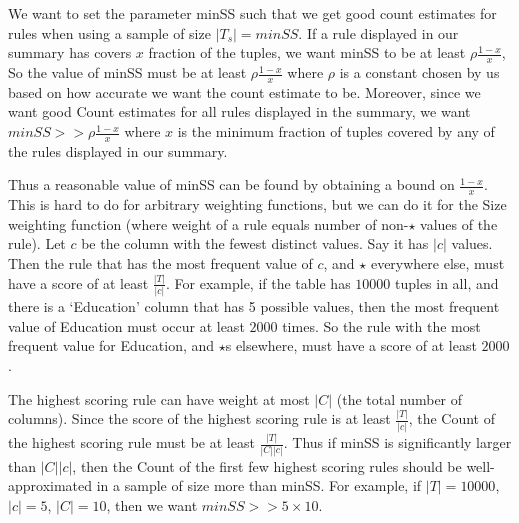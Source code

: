 We want to set the parameter minSS such that we get good count estimates for rules when using a sample of size $|T_s| = minSS$. If a rule displayed in our summary has covers $x$ fraction of the tuples, we want minSS to be at least $\rho\frac{1-x}{x}$, So the value of minSS must be at least $\rho\frac{1-x}{x}$ where $\rho$ is a constant chosen by us based on how accurate we want the count estimate to be. Moreover, since we want good Count estimates for all rules displayed in the summary, we want $minSS >> \rho\frac{1-x}{x}$ where $x$ is the minimum fraction of tuples covered by any of the rules displayed in our summary.

Thus a reasonable value of minSS can be found by obtaining a bound on $\frac{1-x}{x}$. This is hard to do for arbitrary weighting functions, but we can do it for the Size weighting function (where weight of a rule equals number of non-$\star$ values of the rule). Let $c$ be the column with the fewest distinct values. Say it has $|c|$ values. Then the rule that has the most frequent value of $c$, and $\star$ everywhere else, must have a score of at least $\frac{|T|}{|c|}$. For example, if the table has $10000$ tuples in all, and there is a `Education' column that has 5 possible values, then the most frequent value of Education must occur at least $2000$ times. So the rule with the most frequent value for Education, and $\star$s elsewhere, must have a score of at least $2000$. 

The highest scoring rule can have weight at most $|C|$ (the total number of columns). Since the score of the highest scoring rule is at least $\frac{|T|}{|c|}$, the Count of the highest scoring rule must be at least $\frac{|T|}{|C||c|}$. Thus if minSS is significantly larger than $|C||c|$, then the Count of the first few highest scoring rules should be well-approximated in a sample of size more than minSS. For example, if $|T| = 10000$, $|c| = 5$, $|C| = 10$, then we want $minSS >> 5 \times 10$.
